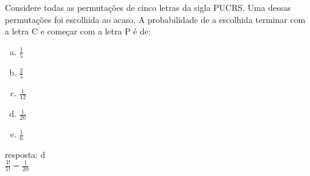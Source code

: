 \begin{ex}
Considere todas as permutações de cinco letras da sigla PUCRS. Uma dessas permutações foi escolhida ao acaso. A probabilidade de a escolhida terminar com a letra C e começar com a letra P é de:
   \begin{enumerate}[(a)]
   \item $\frac{1}{5}$
   \item $\frac{2}{5}$
   \item $\frac{1}{12}$
   \item $\frac{1}{20}$
   \item $\frac{1}{6}$
   \end{enumerate}
     \begin{sol}
      resposta: d \\
      $\frac{3!}{5!}=\frac{1}{20}$
     \end{sol}
\end{ex}